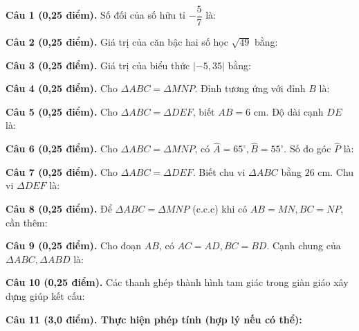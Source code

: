 \documentclass[12pt,a4paper]{article}
\begin{document}
\vspace{1.5mm}
\noindent\textbf{Câu 1 (0,25 điểm).} Số đối của số hữu tỉ $-\dfrac{5}{7}$ là: \par\vspace{2.3mm}
\noindent\textbf{Câu 2 (0,25 điểm).} Giá trị của căn bậc hai số học $\sqrt{49}$ bằng: \par\vspace{2.3mm}
\noindent\textbf{Câu 3 (0,25 điểm).} Giá trị của biểu thức $|-5{,}35|$ bằng: \par\vspace{2.3mm}
\noindent\textbf{Câu 4 (0,25 điểm).} Cho $\Delta ABC = \Delta MNP$. Đỉnh tương ứng với đỉnh $B$ là: \par\vspace{2.3mm}
\noindent\textbf{Câu 5 (0,25 điểm).} Cho $\Delta ABC = \Delta DEF$, biết $AB = 6\text{ cm}$. Độ dài cạnh $DE$ là: \par\vspace{2.3mm}
\noindent\textbf{Câu 6 (0,25 điểm).} Cho $\Delta ABC = \Delta MNP$, có $\widehat{A} = 65^\circ, \widehat{B} = 55^\circ$. Số đo góc $\widehat{P}$ là: \par\vspace{2.3mm}
\noindent\textbf{Câu 7 (0,25 điểm).} Cho $\Delta ABC = \Delta DEF$. Biết chu vi $\Delta ABC$ bằng $26\text{ cm}$. Chu vi $\Delta DEF$ là: \par\vspace{2.3mm}
\noindent\textbf{Câu 8 (0,25 điểm).} Để $\Delta ABC = \Delta MNP$ (c.c.c) khi có $AB=MN, BC=NP$, cần thêm: \par\vspace{2.3mm}
\noindent\textbf{Câu 9 (0,25 điểm).} Cho đoạn $AB$, có $AC = AD, BC = BD$. Cạnh chung của $\Delta ABC, \Delta ABD$ là: \par\vspace{2.3mm}
\noindent\textbf{Câu 10 (0,25 điểm).} Các thanh ghép thành hình tam giác trong giàn giáo xây dựng giúp kết cấu: \par\vspace{2.3mm}
\vspace{0.2mm}
\noindent\textbf{Câu 11 (3,0 điểm). Thực hiện phép tính (hợp lý nếu có thể):}
\vspace{0.8mm}
\end{document}
